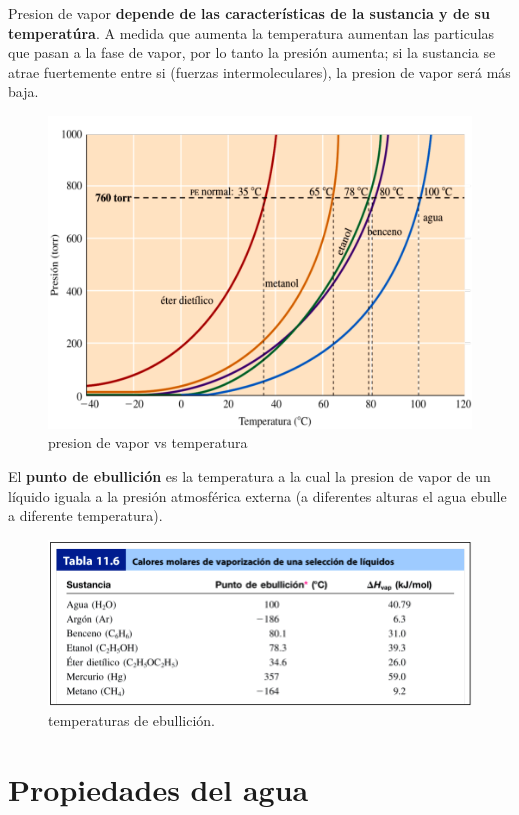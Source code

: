 \documentclass[]{article}
\begin{document}
Presion de vapor \textbf{depende de las características de la sustancia y de su temperatúra}. A medida que aumenta la temperatura aumentan las particulas que pasan a la fase de vapor, por lo tanto la presión aumenta; si la sustancia se atrae fuertemente entre si (fuerzas intermoleculares), la presion de vapor será más baja.

\begin{figure}[H]
\center
\includegraphics[scale=0.35]{foto14.png}
\caption{presion de vapor vs temperatura}
\end{figure}

El \textbf{punto de ebullición} es la temperatura a la cual la presion de vapor de un líquido iguala a la presión atmosférica externa (a diferentes alturas el agua ebulle a diferente temperatura).

\begin{figure}[H]
\center
\includegraphics[scale=0.37]{foto15.png}
\caption{temperaturas de ebullición.}
\end{figure}



\section{Propiedades del agua}
\end{document}
